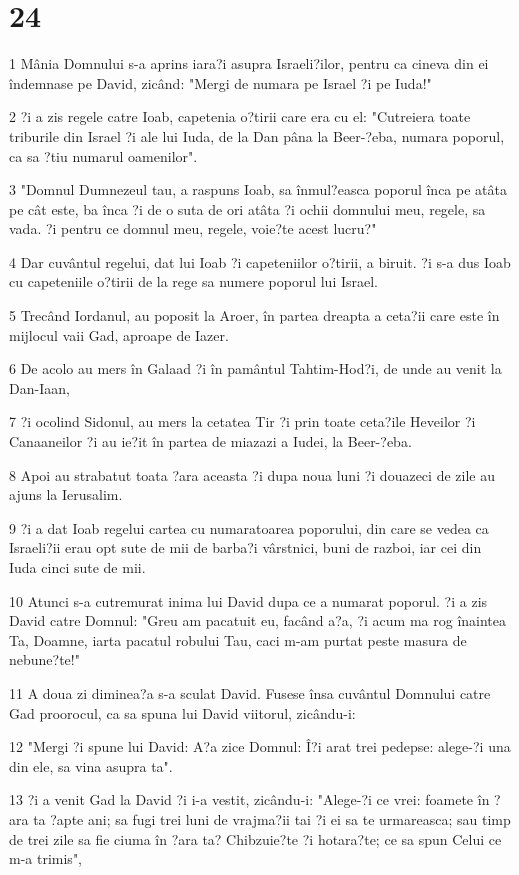 \chapter{24}

\par 1 Mânia Domnului s-a aprins iara?i asupra Israeli?ilor, pentru ca cineva din ei îndemnase pe David, zicând: "Mergi de numara pe Israel ?i pe Iuda!"
\par 2 ?i a zis regele catre Ioab, capetenia o?tirii care era cu el: "Cutreiera toate triburile din Israel ?i ale lui Iuda, de la Dan pâna la Beer-?eba, numara poporul, ca sa ?tiu numarul oamenilor".
\par 3 "Domnul Dumnezeul tau, a raspuns Ioab, sa înmul?easca poporul înca pe atâta pe cât este, ba înca ?i de o suta de ori atâta ?i ochii domnului meu, regele, sa vada. ?i pentru ce domnul meu, regele, voie?te acest lucru?"
\par 4 Dar cuvântul regelui, dat lui Ioab ?i capeteniilor o?tirii, a biruit. ?i s-a dus Ioab cu capeteniile o?tirii de la rege sa numere poporul lui Israel.
\par 5 Trecând Iordanul, au poposit la Aroer, în partea dreapta a ceta?ii care este în mijlocul vaii Gad, aproape de Iazer.
\par 6 De acolo au mers în Galaad ?i în pamântul Tahtim-Hod?i, de unde au venit la Dan-Iaan,
\par 7 ?i ocolind Sidonul, au mers la cetatea Tir ?i prin toate ceta?ile Heveilor ?i Canaaneilor ?i au ie?it în partea de miazazi a Iudei, la Beer-?eba.
\par 8 Apoi au strabatut toata ?ara aceasta ?i dupa noua luni ?i douazeci de zile au ajuns la Ierusalim.
\par 9 ?i a dat Ioab regelui cartea cu numaratoarea poporului, din care se vedea ca Israeli?ii erau opt sute de mii de barba?i vârstnici, buni de razboi, iar cei din Iuda cinci sute de mii.
\par 10 Atunci s-a cutremurat inima lui David dupa ce a numarat poporul. ?i a zis David catre Domnul: "Greu am pacatuit eu, facând a?a, ?i acum ma rog înaintea Ta, Doamne, iarta pacatul robului Tau, caci m-am purtat peste masura de nebune?te!"
\par 11 A doua zi diminea?a s-a sculat David. Fusese însa cuvântul Domnului catre Gad proorocul, ca sa spuna lui David viitorul, zicându-i:
\par 12 "Mergi ?i spune lui David: A?a zice Domnul: Î?i arat trei pedepse: alege-?i una din ele, sa vina asupra ta".
\par 13 ?i a venit Gad la David ?i i-a vestit, zicându-i: "Alege-?i ce vrei: foamete în ?ara ta ?apte ani; sa fugi trei luni de vrajma?ii tai ?i ei sa te urmareasca; sau timp de trei zile sa fie ciuma în ?ara ta? Chibzuie?te ?i hotara?te; ce sa spun Celui ce m-a trimis",
